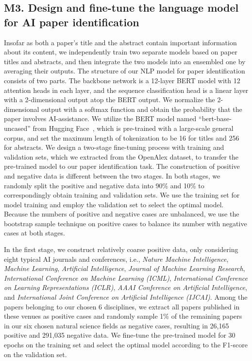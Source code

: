 \subsection*{M3. Design and fine-tune the language model for AI paper identification}
Insofar as both a paper’s title and the abstract contain important information about its content, we independently train two separate models based on paper titles and abstracts, and then integrate the two models into an ensembled one by averaging their outputs.
The structure of our NLP model for paper identification consists of two parts.
The backbone network is a 12-layer BERT model with 12 attention heads in each layer, and the sequence classification head is a linear layer with a 2-dimensional output atop the BERT output.
We normalize the 2-dimensional output with a softmax function and obtain the probability that the paper involves AI-assistance.
We utilize the BERT model named “bert-base-uncased” from Hugging Face~\supercite{HuggingFace}, which is pre-trained with a large-scale general corpus, and set the maximum length of tokenization to be 16 for titles and 256 for abstracts.
We design a two-stage fine-tuning process with training and validation sets, which we extracted from the OpenAlex dataset, to transfer the pre-trained model to our paper identification task.
The construction of positive and negative data is different between the two stages. In both stages, we randomly split the positive and negative data into 90\% and 10\% to correspondingly obtain training and validation sets.
We use the training set for model training and employ the validation set to select the optimal model.
Because the numbers of positive and negative cases are unbalanced, we use the bootstrap sample technique on positive cases to balance its number with negative cases at both stages.

In the first stage, we construct relatively coarse positive data, only considering eight typical AI journals and conferences, i.e., \textit{Nature Machine Intelligence}, \textit{Machine Learning}, \textit{Artificial Intelligence}, \textit{Journal of Machine Learning Research}, \textit{International Conference on Machine Learning (ICML)}, \textit{International Conference on Learning Representations (ICLR)}, \textit{AAAI Conference on Artificial Intelligence}, and \textit{International Joint Conference on Artificial Intelligence (IJCAI)}.
Among the papers belonging to our chosen 6 disciplines, we extract all papers published in these venues as positive cases and randomly sample 1\% of the remaining papers in our six chosen natural science fields as negative cases, resulting in 26,165 positive and 291,035 negative data.
We fine-tune the pre-trained model for 30 epochs on the training set and select the optimal model according to the F1-score on the validation set.


